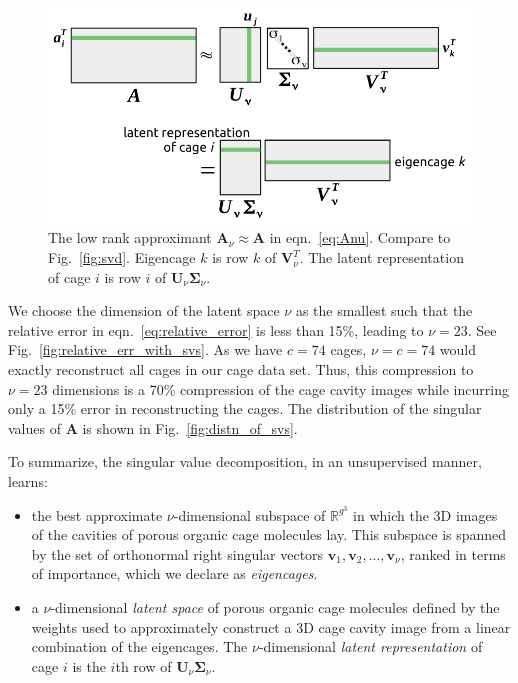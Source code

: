\documentclass[journal=jacsat,manuscript=article,layout=traditional]{achemso}
\begin{document}
\begin{figure}
\centering
	\includegraphics[width=0.75\columnwidth]{svd_approx-crop.pdf}
	\caption{The low rank approximant $\mathbf{A}_\nu \approx \mathbf{A}$ in eqn.~\ref{eq:Anu}. Compare to Fig.~\ref{fig:svd}. Eigencage $k$ is row $k$ of $\mathbf{V}_\nu^T$. The latent representation of cage $i$ is row $i$ of $\mathbf{U}_\nu \mathbf{\Sigma}_\nu$.
	} \label{fig:svd_approx}
\end{figure}

We choose the dimension of the latent space $\nu$ as the smallest such that the relative error in eqn.~\ref{eq:relative_error} is less than 15\%, leading to $\nu=23$. See Fig.~\ref{fig:relative_err_with_svs}. As we have $c=74$ cages, $\nu=c=74$ would exactly reconstruct all cages in our cage data set. Thus, this compression to $\nu=23$ dimensions is a 70\% compression of the cage cavity images while incurring only a 15\% error in reconstructing the cages. The distribution of the singular values of $\mathbf{A}$ is shown in Fig.~\ref{fig:distn_of_svs}.

To summarize, the singular value decomposition, in an unsupervised manner, learns:
\begin{itemize}
\item the best approximate $\nu$-dimensional subspace of $\mathbb{R}^{g^3}$ in which the 3D images of the cavities of porous organic cage molecules lay. This subspace is spanned by the set of orthonormal right singular vectors $\mathbf{v}_1, \mathbf{v}_2, ..., \mathbf{v}_\nu$, ranked in terms of importance, which we declare as \emph{eigencages}.
\item a $\nu$-dimensional \emph{latent space} of porous organic cage molecules defined by the weights used to approximately construct a 3D cage cavity image from a linear combination of the eigencages. The $\nu$-dimensional \emph{latent representation} of cage $i$ is the $i$th row of $\mathbf{U}_\nu \mathbf{\Sigma}_\nu$.
\end{itemize}
\end{document}
